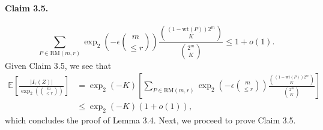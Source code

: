 \documentclass[10pt,a4paper]{article}
\begin{document}
\paragraph{Claim 3.5.}
\[\sum_{P\in\mathrm{RM}(m,r)}\operatorname{exp}_2\left(-\epsilon\binom m{\le r}\right)\frac{\binom{(1-\mathrm{wt}(P))2^m}K}{\binom{2^m}K}\le1+o(1).\]
Given Claim 3.5, we see that
\begin{align*}\mathbb E\left[\frac{|I_r(Z)|}{\operatorname{exp}_2\left(\binom m{\le r}\right)}\right]&=\operatorname{exp}_2(-K)\left[\sum_{P\in\mathrm{RM}(m,r)}\operatorname{exp}_2\left(-\epsilon\binom m{\le r}\right)\frac{\binom{(1-\mathrm{wt}(P))2^m}K}{\binom{2^m}K}\right]\\&\le\operatorname{exp}_2(-K)(1+o(1)),\end{align*}
which concludes the proof of Lemma 3.4. Next, we proceed to prove Claim 3.5.
\end{document}

